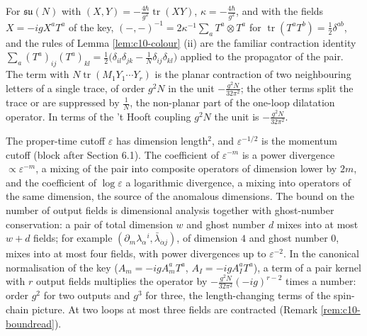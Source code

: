 \begin{remark}
For $\mathfrak{su}(N)$ with $(X,Y)=-\tfrac{4\hbar}{g^2}\operatorname{tr}(XY)$, $\kappa=-\tfrac{4\hbar}{g^2}$, and with the fields $X=-igX^aT^a$ of the key, $(-,-)^{-1}=2\kappa^{-1}\sum_aT^a\otimes T^a$ for $\operatorname{tr}(T^aT^b)=\tfrac12\delta^{ab}$, and the rules of Lemma \ref{lem:c10-colour} (ii) are the familiar contraction identity $\sum_a(T^a)_{ij}(T^a)_{kl}=\tfrac12\big(\delta_{il}\delta_{jk}-\tfrac1N\delta_{ij}\delta_{kl}\big)$ applied to the propagator of the pair. The term with $N\operatorname{tr}(M_1Y_1\cdots Y_r)$ is the planar contraction of two neighbouring letters of a single trace, of order $g^2N$ in the unit $-\frac{g^2N}{32\pi^2}$; the other terms split the trace or are suppressed by $\tfrac1N$, the non-planar part of the one-loop dilatation operator. In terms of the 't Hooft coupling $g^2N$ the unit is $-\frac{g^2N}{32\pi^2}$.
\end{remark}

\begin{remark}
The proper-time cutoff $\varepsilon$ has dimension length$^2$, and $\varepsilon^{-1/2}$ is the momentum cutoff (block after Section 6.1). The coefficient of $\varepsilon^{-m}$ is a power divergence $\propto\varepsilon^{-m}$, a mixing of the pair into composite operators of dimension lower by $2m$, and the coefficient of $\log\varepsilon$ a logarithmic divergence, a mixing into operators of the same dimension, the source of the anomalous dimensions. The bound on the number of output fields is dimensional analysis together with ghost-number conservation: a pair of total dimension $w$ and ghost number $d$ mixes into at most $w+d$ fields; for example $(\partial_m\lambda_\alpha{}^i,\bar\lambda_{\dot\alpha j})$, of dimension $4$ and ghost number $0$, mixes into at most four fields, with power divergences up to $\varepsilon^{-2}$. In the canonical normalisation of the key ($A_m=-igA^a_mT^a$, $A_I=-igA^a_IT^a$), a term of a pair kernel with $r$ output fields multiplies the operator by $-\frac{g^2N}{32\pi^2}(-ig)^{r-2}$ times a number: order $g^2$ for two outputs and $g^3$ for three, the length-changing terms of the spin-chain picture. At two loops at most three fields are contracted (Remark \ref{rem:c10-boundread}).
\end{remark}


